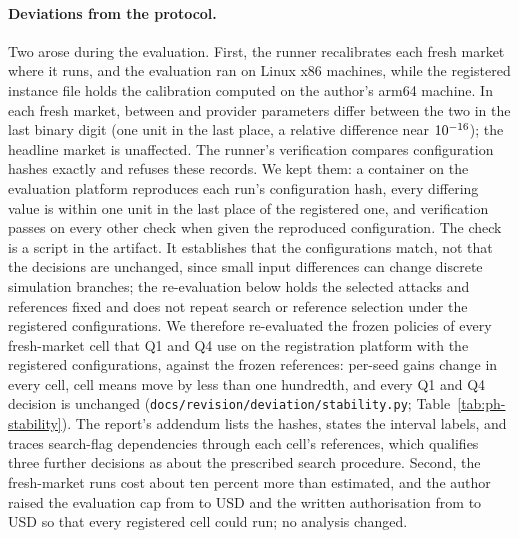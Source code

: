 \documentclass[11pt]{article}
\begin{document}
\paragraph{Deviations from the protocol.} Two arose during the evaluation. First, the runner recalibrates each fresh market where it runs, and the evaluation ran on Linux x86 machines, while the registered instance file holds the calibration computed on the author's arm64 machine. In each fresh market, between  and  provider parameters differ between the two in the last binary digit (one unit in the last place, a relative difference near $10^{-16}$); the headline market is unaffected. The runner's verification compares configuration hashes exactly and refuses these records. We kept them: a container on the evaluation platform reproduces each run's configuration hash, every differing value is within one unit in the last place of the registered one, and verification passes on every other check when given the reproduced configuration. The check is a script in the artifact. It establishes that the configurations match, not that the decisions are unchanged, since small input differences can change discrete simulation branches; the re-evaluation below holds the selected attacks and references fixed and does not repeat search or reference selection under the registered configurations. We therefore re-evaluated the frozen policies of every fresh-market cell that Q1 and Q4 use on the registration platform with the registered configurations, against the frozen references: per-seed gains change in every cell, cell means move by less than one hundredth, and every Q1 and Q4 decision is unchanged (\texttt{docs/revision/deviation/stability.py}; Table~\ref{tab:ph-stability}). The report's addendum lists the hashes, states the interval labels, and traces search-flag dependencies through each cell's references, which qualifies three further decisions as about the prescribed search procedure. Second, the fresh-market runs cost about ten percent more than estimated, and the author raised the evaluation cap from  to  USD and the written authorisation from  to  USD so that every registered cell could run; no analysis changed.
\end{document}
